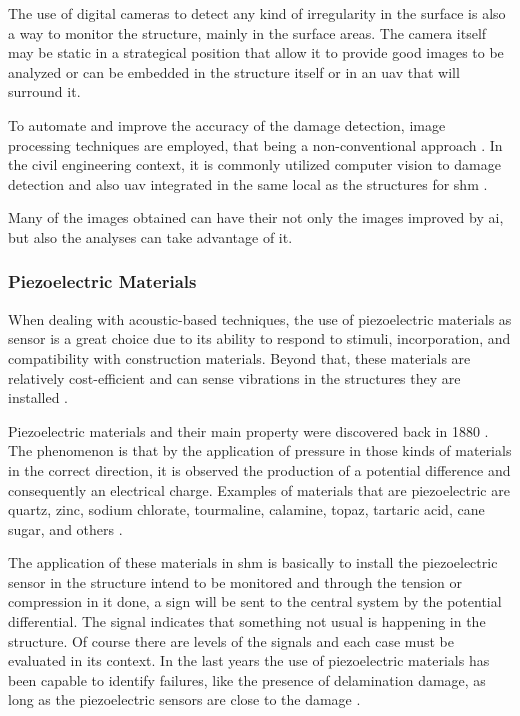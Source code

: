 The use of digital cameras to detect any kind of irregularity in the surface is also a way to monitor the structure, mainly in the surface areas. 
The camera itself may be static in a strategical position that allow it to provide good images to be analyzed or can be embedded in the structure itself or in an \gls*{uav} that will surround it.

To automate and improve the accuracy of the damage detection, image processing techniques are employed, that being a non-conventional approach \citep{sharma2016}. 
In the civil engineering context, it is commonly utilized computer vision to damage detection \citep{feng2018} and also \gls*{uav} integrated in the same local as the structures for \gls*{shm} \citep{sankarasrinivasan2015}.

Many of the images obtained can have their not only the images improved by \gls*{ai}, but also the analyses can take advantage of it.

\subsubsection*{Piezoelectric Materials}

When dealing with acoustic-based techniques, the use of piezoelectric materials as sensor is a great choice due to its ability to respond to stimuli, incorporation, and compatibility with construction materials. 
Beyond that, these materials are relatively cost-efficient and can sense vibrations in the structures they are installed \citep{jiao2020}.

Piezoelectric materials and their main property were discovered back in 1880 \citep{curie1880}. 
The phenomenon is that by the application of pressure in those kinds of materials in the correct direction, it is observed the production of a potential difference and consequently an electrical charge. 
Examples of materials that are piezoelectric are quartz, zinc, sodium chlorate, tourmaline, calamine, topaz, tartaric acid, cane sugar, and others \citep{brown1962}.

The application of these materials in \gls*{shm} is basically to install the piezoelectric sensor in the structure intend to be monitored and through the tension or compression in it done, a sign will be sent to the central system by the potential differential. 
The signal indicates that something not usual is happening in the structure. Of course there are levels of the signals and each case must be evaluated in its context. 
In the last years the use of piezoelectric materials has been capable to identify failures, like the presence of delamination damage, as long as the piezoelectric sensors are close to the damage \citep{maio2011}.

